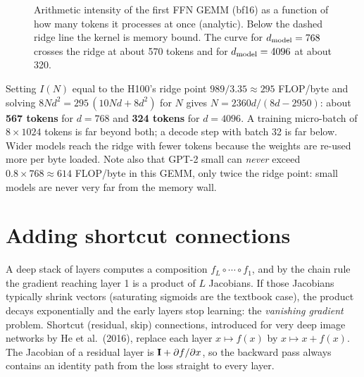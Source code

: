 \begin{figure}[t]
\centering
{}
\caption{Arithmetic intensity of the first FFN GEMM (bf16) as a function of how many tokens it
processes at once (analytic). Below the dashed ridge line the kernel is memory bound. The curve for
$d_{\text{model}}=768$ crosses the ridge at about 570 tokens and for $d_{\text{model}}=4096$ at about 320.}
\label{fig:gpt:intensity}
\end{figure}

\begin{napkinmath}
Setting $I(N)$ equal to the H100's ridge point $989/3.35\approx295$ FLOP/byte and solving
$8Nd^2=295\,(10Nd+8d^2)$ for $N$ gives $N=2360d/(8d-2950)$: about \textbf{567 tokens} for $d=768$ and
\textbf{324 tokens} for $d=4096$. A training micro-batch of $8\times1024$ tokens is far beyond
both; a decode step with batch 32 is far below. Wider models reach the ridge with fewer tokens
because the weights are re-used more per byte loaded. Note also that GPT-2 small can \emph{never}
exceed $0.8\times768\approx614$ FLOP/byte in this GEMM, only twice the ridge point: small models
are never very far from the memory wall.
\end{napkinmath}

\section{Adding shortcut connections}\label{sec:gpt:shortcut}

A deep stack of layers computes a composition $f_L\circ\cdots\circ f_1$, and by the chain rule
the gradient reaching layer 1 is a product of $L$ Jacobians. If those Jacobians typically shrink
vectors (saturating sigmoids are the textbook case), the product decays exponentially and the
early layers stop learning: the \emph{vanishing gradient} problem. Shortcut (residual, skip)
connections, introduced for very deep image networks by He et al.~(2016), replace each layer
$x\mapsto f(x)$ by $x\mapsto x+f(x)$. The Jacobian of a residual layer is $\mathbf{I}+\partial f/\partial x$,
so the backward pass always contains an identity path from the loss straight to every layer.

